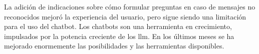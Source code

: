 
La adición de indicaciones sobre cómo formular preguntas en caso de mensajes no reconocidos  mejoró la experiencia del usuario, pero sigue siendo una limitación para el uso del chatbot. Los chatbots son una herramienta en crecimiento, impulsados por la potencia creciente de los \acrlong{llm}. En los últimos meses se ha mejorado enormemente las posibilidades y las herramientas disponibles.
